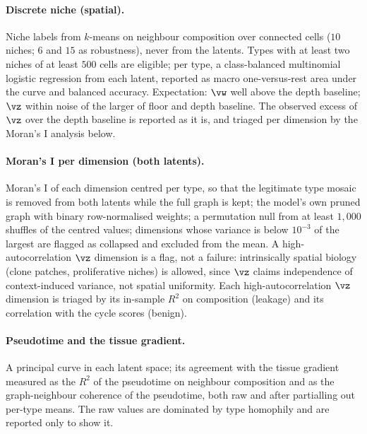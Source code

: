 \paragraph{Discrete niche (spatial).} Niche labels from $k$-means on neighbour composition over connected cells ($10$ niches; $6$ and $15$ as robustness), never from the latents. Types with at least two niches of at least $500$ cells are eligible; per type, a class-balanced multinomial logistic regression from each latent, reported as macro one-versus-rest area under the curve \citep{hand2001} and balanced accuracy. Expectation: $\vw$ well above the depth baseline; $\vz$ within noise of the larger of floor and depth baseline. The observed excess of $\vz$ over the depth baseline is reported as it is, and triaged per dimension by the Moran's I analysis below.

\paragraph{Moran's I per dimension (both latents).} Moran's I \citep{moran1950} of each dimension centred per type, so that the legitimate type mosaic is removed from both latents while the full graph is kept; the model's own pruned graph with binary row-normalised weights; a permutation null from at least $1{,}000$ shuffles of the centred values; dimensions whose variance is below $10^{-3}$ of the largest are flagged as collapsed and excluded from the mean. A high-autocorrelation $\vz$ dimension is a flag, not a failure: intrinsically spatial biology (clone patches, proliferative niches) is allowed, since $\vz$ claims independence of context-induced variance, not spatial uniformity. Each high-autocorrelation $\vz$ dimension is triaged by its in-sample $R^2$ on composition (leakage) and its correlation with the cycle scores (benign).

\paragraph{Pseudotime and the tissue gradient.} A principal curve \citep{hastie1989} in each latent space; its agreement with the tissue gradient measured as the $R^2$ of the pseudotime on neighbour composition and as the graph-neighbour coherence of the pseudotime, both raw and after partialling out per-type means. The raw values are dominated by type homophily and are reported only to show it.

